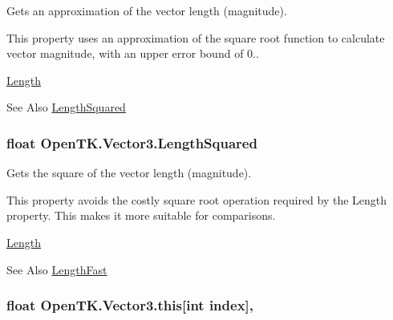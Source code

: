 Gets an approximation of the vector length (magnitude). 

This property uses an approximation of the square root function to calculate vector magnitude, with an upper error bound of 0.. 

\hyperlink{struct_open_t_k_1_1_vector3_a628fb895a38c0d423479e16a9309a64b}{Length} \begin{DoxySeeAlso}{See Also}
\hyperlink{struct_open_t_k_1_1_vector3_a160290ae46295484dfa7d564dce347f4}{Length\-Squared}


\end{DoxySeeAlso}
\hypertarget{struct_open_t_k_1_1_vector3_a160290ae46295484dfa7d564dce347f4}{
\subsubsection[{Length\-Squared}]{\setlength{\rightskip}{0pt plus 5cm}float Open\-T\-K.\-Vector3.\-Length\-Squared\hspace{0.3cm}{\ttfamily [get]}}}\label{struct_open_t_k_1_1_vector3_a160290ae46295484dfa7d564dce347f4}


Gets the square of the vector length (magnitude). 

This property avoids the costly square root operation required by the Length property. This makes it more suitable for comparisons. 

\hyperlink{struct_open_t_k_1_1_vector3_a628fb895a38c0d423479e16a9309a64b}{Length} \begin{DoxySeeAlso}{See Also}
\hyperlink{struct_open_t_k_1_1_vector3_ab76d7854a462ae971dc5b10947f34619}{Length\-Fast}


\end{DoxySeeAlso}
\hypertarget{struct_open_t_k_1_1_vector3_a8981d021599819438d96b7de1f1a2419}{
\subsubsection[{this[int index]}]{\setlength{\rightskip}{0pt plus 5cm}float Open\-T\-K.\-Vector3.\-this\mbox{[}int index\mbox{]}\hspace{0.3cm}{\ttfamily [get]}, {\ttfamily [set]}}}\label{struct_open_t_k_1_1_vector3_a8981d021599819438d96b7de1f1a2419}


